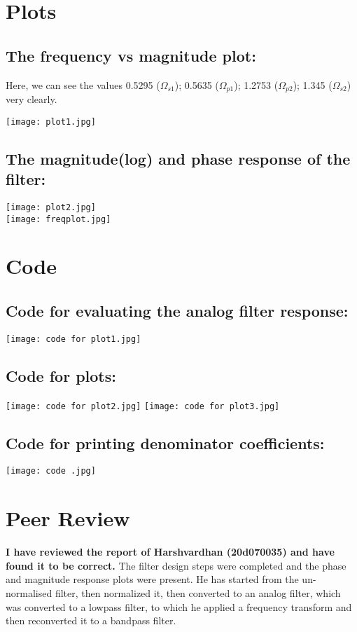 \documentclass[12pt]{article}
\begin{document}
\section{Plots}

    
\subsection{The frequency vs magnitude plot:}Here, we can see the values 0.5295 ($\Omega_{s1}$); 0.5635 ($\Omega_{p1}$); 1.2753 ($\Omega_{p2}$); 1.345 ($\Omega_{s2}$) very clearly.
\begin{center}
\texttt{[image: plot1.jpg]}
\end{center}
\subsection{The magnitude(log) and phase response of the filter:}
\begin{center}
\texttt{[image: plot2.jpg]}
\\\texttt{[image: freqplot.jpg]}
\end{center}
\section{Code}
\subsection{Code for evaluating the analog filter response:}
\begin{center}
\texttt{[image: code for plot1.jpg]}

\end{center}
\subsection{Code for plots:}
\texttt{[image: code for plot2.jpg]}
\texttt{[image: code for plot3.jpg]}
\subsection{Code for printing denominator coefficients:}
\begin{center}
\texttt{[image: code .jpg]}
\end{center}
\section{Peer Review}
\textbf{I have reviewed the report of Harshvardhan (20d070035) and have found it to be correct.} The filter design steps were completed and the phase and magnitude response plots were present. He has started from the un-normalised filter, then normalized it, then converted to an analog filter, which was converted to a lowpass filter, to which he applied a frequency transform and then reconverted it to a bandpass filter.
\end{document}
